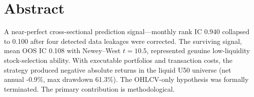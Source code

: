 \section{Abstract}
A near-perfect cross-sectional prediction signal---monthly rank IC 0.940 collapsed to 0.100 after four detected data leakages were corrected.
The surviving signal, mean OOS IC 0.108 with Newey--West $t = 10.5$, represented genuine low-liquidity stock-selection ability.
With executable portfolios and transaction costs, the strategy produced negative absolute returns in the liquid U50 universe (net annual -0.9\%, max drawdown 61.3\%).
The OHLCV-only hypothesis was formally terminated. The primary contribution is methodological.
